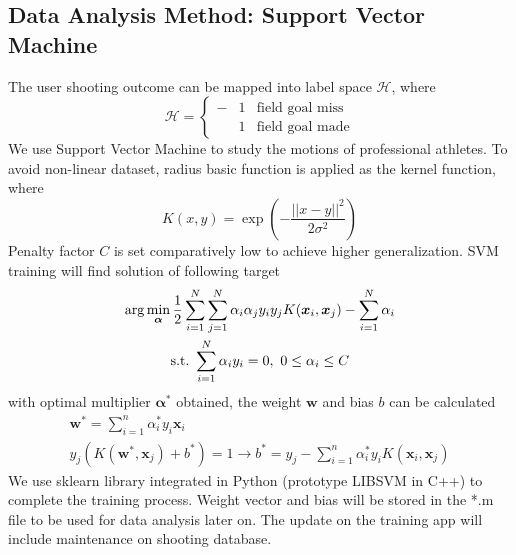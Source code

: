 \documentclass[12pt]{article}
\begin{document}
    \subsection{Data Analysis Method: Support Vector Machine}
    The user shooting outcome can be mapped into label space $\mathcal{H}$, where
    \begin{equation}
        \mathcal{H} = \left\{ \begin{aligned}
            -&1 &\text{field goal miss} \\
            &1 &\text{field goal made}
        \end{aligned} \right.
    \end{equation}
We use Support Vector Machine to study the motions of professional athletes. To avoid non-linear dataset, radius basic function is applied as the kernel function, where
\begin{equation}
    K(x, y) = \exp \left( -\frac{||x - y ||^2}{2 \sigma^2}\right)
\end{equation}
Penalty factor $C$ is set comparatively low to achieve higher generalization. SVM training will find solution of following target
\begin{gather}
    \arg \min_{\bm{\alpha}} \frac{1}{2}\sum_{i=1}^N \sum_{j=1}^N \alpha_i \alpha_j y_i y_j K(\bm{x}_i,\bm{x}_j) - \sum_{i=1}^N \alpha_i  \notag \\ \text{s.t.}~\sum_{i=1}^N \alpha_i y_i = 0,~0 \leq \alpha_i \leq C
\end{gather}
with optimal multiplier $\bm{\alpha}^*$ obtained, the weight $\bm{w}$ and bias $b$ can be calculated
\begin{gather}
    \bm{w}^* = \sum_{i=1}^n \alpha_i^* y_i \bm{x}_i \\
    y_j(K(\bm{w}^*, \bm{x}_j) + b^*) = 1 \rightarrow b^* = y_j - \sum_{i=1}^n \alpha_i^* y_i K(\bm{x}_i, \bm{x}_j)
\end{gather}
We use sklearn library integrated in Python (prototype LIBSVM in C++) to complete the training process. Weight vector and bias will be stored in the *.m file to be used for data analysis later on. The update on the training app will include maintenance on shooting database. 
\end{document}
